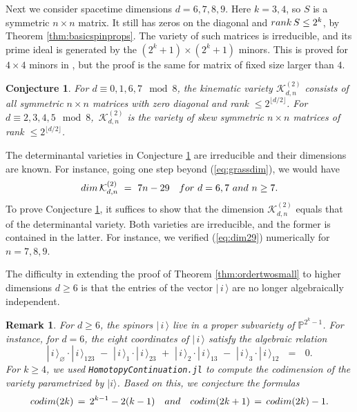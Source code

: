 \documentclass[english]{ourlematema}
\numberwithin{theorem}{section}
\newtheorem{remark}[theorem]{Remark}
\newtheorem{conjecture}[theorem]{Conjecture}
\theoremstyle{definition}
\newcommand{\PP}{\mathbb{P}}
\begin{document}
Next we consider spacetime dimensions $d = 6,7,8,9$.
Here $k = 3,4$, so $S$ is a symmetric $n \times n$ matrix.
It still has zeros on the diagonal and ${\rm rank} \,S \leq 2^k$,
by Theorem \ref{thm:basicspinprops}.
The variety of such matrices is irreducible, and its prime ideal
is generated by the $(2^k+1) \times (2^k+1)$ minors.
This is proved for $4 \times 4$ minors in \cite[Theorem 3.5]{DFRS},
but the proof is the same for matrix of fixed size larger than $4$.

\begin{conjecture} \label{conj:K2}
For $d \equiv 0,1,6,7 \!\!\mod{8}$,
the kinematic variety $\mathcal{K}^{(2)}_{d,n}$
consists of all symmetric $n \times n$ matrices
with zero diagonal and rank $\leq 2^{\lfloor d/2 \rfloor}$. 
For $d \equiv 2,3,4,5 \!\!\mod{8}$,
$\,\mathcal{K}^{(2)}_{d,n}$ is the variety of
 skew symmetric $n \times n$ matrices
of rank $\leq 2^{\lfloor d/2 \rfloor}$.
\end{conjecture}

The determinantal varieties in Conjecture \ref{conj:K2}
are irreducible and their dimensions are known. For instance,
going one step beyond (\ref{eq:grassdim}), we would have
\begin{equation}
\label{eq:dim29}
 {\rm dim}\,\mathcal{K}^{(2)}_{d,n} \,\,= \,\,
7n-29 \quad {\rm for} \,\, d=6,7\,\,{\rm and}\,\,n \geq 7 . 
\end{equation}
To prove Conjecture \ref{conj:K2}, it suffices to show that
the dimension $\mathcal{K}^{(2)}_{d,n}$
equals that of the determinantal variety.
Both varieties are irreducible, and the former is contained in the latter.
For instance, we verified (\ref{eq:dim29}) numerically for $n=7,8,9$.

The difficulty in extending the proof of Theorem 
\ref{thm:ordertwosmall} to higher dimensions $d \geq 6$ is that the
entries of the vector $|\, i \,\rangle$ are 
no longer algebraically independent.

\begin{remark}
For $d \ge 6$, the spinors $|\,i \,\rangle$ live in a proper subvariety of $\PP^{2^k-1}$. For instance, for $d=6$,
 the eight coordinates of $| \,i\, \rangle$ satisfy the algebraic relation
\begin{equation}
    |\, i \,\rangle_\varnothing \cdot |\, i \,\rangle_{123} \,\,-\,\, |\, i \,\rangle_1 \cdot 
    |\, i \,\rangle_{23} \,\,+\,\, |\, i \,\rangle_2 \cdot |\, i \,\rangle_ {13}
    \,\,-\,\, |\, i \,\rangle_3 \cdot |\, i \,\rangle_{12} \,\,\,\,=\,\,\,\, 0.
\end{equation}
For $k \geq 4$, we used {\tt HomotopyContinuation.jl} \cite{julia} 
to compute the codimension of the variety 
parametrized by $| i \rangle$. Based on this, we conjecture the formulas
\begin{equation}
\label{eq:eulerian}
{\rm codim}(2k)\, =\, 2^{k - 1} - 2(k - 1) \quad {\rm and} \quad {\rm codim}(2k + 1) \,=\, {\rm codim}(2k) - 1.
\end{equation}
\end{remark}
\end{document}
